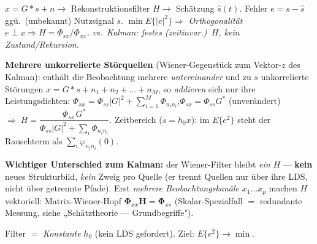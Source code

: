 \vspace{0.12em}
\parbox{0.97\linewidth}{\footnotesize $x=G*s+n\to$ Rekonstruktionsfilter $H\to$ Schätzung $\hat s(t)$.\;
Fehler $e{=}s-\hat s$ ggü.\ (unbekannt) Nutzsignal $s$.\;
$\min E\{|e|^2\}\Rightarrow$ \emph{Orthogonalität} $e\perp x\Rightarrow H{=}\Phi_{sx}/\Phi_{xx}$.\;
\itshape vs.\ Kalman: festes (zeitinvar.)\ $H$, kein Zustand/Rekursion.}\par\raggedright
\par\vspace{0.25em}\noindent\footnotesize
\textbf{Mehrere unkorrelierte Störquellen} (Wiener-Gegenstück zum Vektor-$z$ des Kalman): enthält die
Beobachtung mehrere \emph{untereinander} und zu $s$ unkorrelierte Störungen
$x=G*s+n_1+n_2+\dots+n_M$, so \emph{addieren} sich nur ihre Leistungsdichten:\;
$\Phi_{xx}=\Phi_{ss}|G|^2+\sum_{i=1}^{M}\Phi_{n_in_i}$,\quad $\Phi_{sx}=\Phi_{ss}G^*$ (unverändert)
$\Rightarrow\;\boxed{H=\dfrac{\Phi_{ss}\,G^*}{\Phi_{ss}|G|^2+\sum_i\Phi_{n_in_i}}}$.\;
Zeitbereich ($\hat s{=}h_0 x$): im $E\{e^2\}$ steht der Rauschterm als $\sum_i\varphi_{n_in_i}(0)$.
\par\vspace{0.12em}\noindent
\textbf{Wichtiger Unterschied zum Kalman:} der Wiener-Filter bleibt \emph{ein} $H$ — \textbf{kein}
neues Strukturbild, \emph{kein} Zweig pro Quelle (er trennt Quellen nur über ihre LDS, nicht über
getrennte Pfade). Erst \emph{mehrere Beobachtungskanäle} $x_1\dots x_p$ machen $H$ vektoriell:
Matrix-Wiener-Hopf $\boldsymbol\Phi_{xx}\mathbf H=\boldsymbol\Phi_{xs}$ (Skalar-Spezialfall $=$
redundante Messung, siehe „Schätztheorie — Grundbegriffe").
\bereichende

\noindent\footnotesize
Filter $=$ \emph{Konstante} $h_0$ (kein LDS gefordert).\; Ziel: $E\{e^2\}\to\min$.
\begin{rezept}
\end{rezept}
\bereichende


